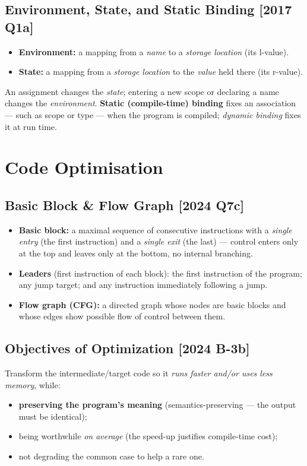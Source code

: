 \documentclass[12pt, a4paper]{article}
\newenvironment{qbox}{\begin{mdframed}[style=qframe]}{\end{mdframed}}
\newcommand{\yr}[1]{{\small\color{accent}\textbf{[#1]}}}
\newcommand{\term}[1]{\textbf{\color{keyblue}#1}}
\begin{document}
\subsection{Environment, State, and Static Binding \yr{2017 Q1a}}
\begin{qbox}
\begin{itemize}
\item \term{Environment:} a mapping from a \emph{name} to a \emph{storage location} (its l-value).
\item \term{State:} a mapping from a \emph{storage location} to the \emph{value} held there (its r-value).
\end{itemize}
An assignment changes the \emph{state}; entering a new scope or declaring a name changes the \emph{environment}.
\term{Static (compile-time) binding} fixes an association — such as scope or type — when the program is compiled;
\emph{dynamic binding} fixes it at run time.
\end{qbox}

\section{Code Optimisation}

\subsection{Basic Block \& Flow Graph \yr{2024 Q7c}}
\begin{qbox}
\begin{itemize}
\item \term{Basic block:} a maximal sequence of consecutive instructions with a \emph{single entry} (the first instruction)
and a \emph{single exit} (the last) — control enters only at the top and leaves only at the bottom, no internal branching.
\item \term{Leaders} (first instruction of each block): the first instruction of the program; any jump target; and any
instruction immediately following a jump.
\item \term{Flow graph (CFG):} a directed graph whose nodes are basic blocks and whose edges show possible flow of control between them.
\end{itemize}
\end{qbox}

\subsection{Objectives of Optimization \yr{2024 B-3b}}
\begin{qbox}
Transform the intermediate/target code so it \emph{runs faster and/or uses less memory}, while:
\begin{itemize}
\item \term{preserving the program's meaning} (semantics-preserving — the output must be identical);
\item being worthwhile \emph{on average} (the speed-up justifies compile-time cost);
\item not degrading the common case to help a rare one.
\end{itemize}
\end{qbox}
\end{document}

